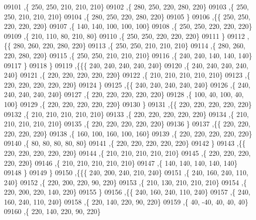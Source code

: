 \begin{DoxyCode}
09101     ,\{   250,   250,   210,   210,   210\}
09102     ,\{   280,   250,   220,   280,   220\}
09103     ,\{   250,   250,   210,   210,   210\}
09104     ,\{   280,   250,   220,   280,   220\}
09105     \}
09106    ,\{\{   250,   250,   220,   220,   220\}
09107     ,\{   140,   140,   100,   100,   100\}
09108     ,\{   250,   250,   220,   220,   220\}
09109     ,\{   210,   110,    80,   210,    80\}
09110     ,\{   250,   250,   220,   220,   220\}
09111     \}
09112    ,\{\{   280,   260,   220,   280,   220\}
09113     ,\{   250,   250,   210,   210,   210\}
09114     ,\{   280,   260,   220,   280,   220\}
09115     ,\{   250,   250,   210,   210,   210\}
09116     ,\{   240,   240,   140,   140,   140\}
09117     \}
09118    \}
09119   ,\{\{\{   240,   240,   240,   240,   240\}
09120     ,\{   240,   240,   240,   240,   240\}
09121     ,\{   220,   220,   220,   220,   220\}
09122     ,\{   210,   210,   210,   210,   210\}
09123     ,\{   220,   220,   220,   220,   220\}
09124     \}
09125    ,\{\{   240,   240,   240,   240,   240\}
09126     ,\{   240,   240,   240,   240,   240\}
09127     ,\{   220,   220,   220,   220,   220\}
09128     ,\{   100,    40,   100,    40,   100\}
09129     ,\{   220,   220,   220,   220,   220\}
09130     \}
09131    ,\{\{   220,   220,   220,   220,   220\}
09132     ,\{   210,   210,   210,   210,   210\}
09133     ,\{   220,   220,   220,   220,   220\}
09134     ,\{   210,   210,   210,   210,   210\}
09135     ,\{   220,   220,   220,   220,   220\}
09136     \}
09137    ,\{\{   220,   220,   220,   220,   220\}
09138     ,\{   160,   100,   160,   100,   160\}
09139     ,\{   220,   220,   220,   220,   220\}
09140     ,\{    80,    80,    80,    80,    80\}
09141     ,\{   220,   220,   220,   220,   220\}
09142     \}
09143    ,\{\{   220,   220,   220,   220,   220\}
09144     ,\{   210,   210,   210,   210,   210\}
09145     ,\{   220,   220,   220,   220,   220\}
09146     ,\{   210,   210,   210,   210,   210\}
09147     ,\{   140,   140,   140,   140,   140\}
09148     \}
09149    \}
09150   ,\{\{\{   240,   200,   240,   210,   240\}
09151     ,\{   240,   160,   240,   110,   240\}
09152     ,\{   220,   200,   220,    90,   220\}
09153     ,\{   210,   130,   210,   210,   210\}
09154     ,\{   220,   200,   220,   140,   220\}
09155     \}
09156    ,\{\{   240,   160,   240,   110,   240\}
09157     ,\{   240,   160,   240,   110,   240\}
09158     ,\{   220,   140,   220,    90,   220\}
09159     ,\{    40,   -40,    40,    40,    40\}
09160     ,\{   220,   140,   220,    90,   220\}

\end{DoxyCode}
